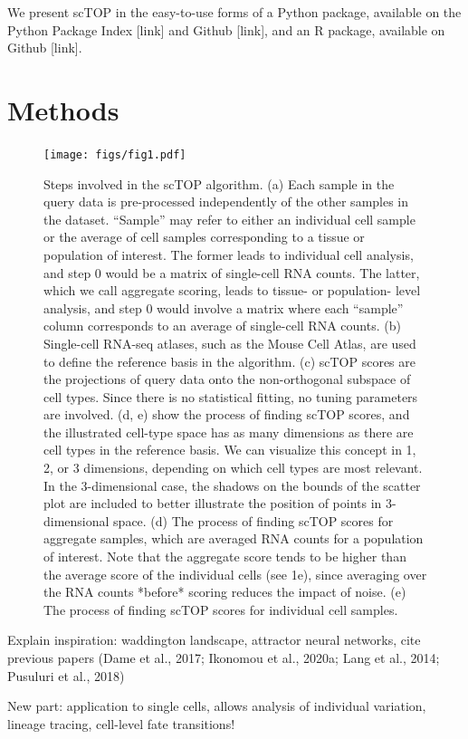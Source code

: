 \documentclass[aps,superscriptaddress, notitlepage,longbibliography]{revtex4-1}
\begin{document}
We present scTOP in the easy-to-use forms of a Python package, available on the Python Package Index [link] and Github [link], and an R package, available on Github [link].

\section{Methods}
\begin{figure}
	\centering
		\texttt{[image: figs/fig1.pdf]}
	\caption{Steps involved in the scTOP algorithm. (a) Each sample in the query data is pre-processed independently of the other samples in the dataset. “Sample” may refer to either an individual cell sample or the average of cell samples corresponding to a tissue or population of interest. The former leads to individual cell analysis, and step 0 would be a matrix of single-cell RNA counts. The latter, which we call aggregate scoring, leads to tissue- or population- level analysis, and step 0 would involve a matrix where each “sample” column corresponds to an average of single-cell RNA counts. (b) Single-cell RNA-seq atlases, such as the Mouse Cell Atlas, are used to define the reference basis in the algorithm. (c) scTOP scores are the projections of query data onto the non-orthogonal subspace of cell types. Since there is no statistical fitting, no tuning parameters are involved. (d, e) show the process of finding scTOP scores, and the illustrated cell-type space has as many dimensions as there are cell types in the reference basis. We can visualize this concept in 1, 2, or 3 dimensions, depending on which cell types are most relevant. In the 3-dimensional case, the shadows on the bounds of the scatter plot are included to better illustrate the position of points in 3-dimensional space. (d) The process of finding scTOP scores for aggregate samples, which are averaged RNA counts for a population of interest. Note that the aggregate score tends to be higher than the average score of the individual cells (see 1e), since averaging over the RNA counts *before* scoring reduces the impact of noise. (e) The process of finding scTOP scores for individual cell samples.}
	\label{FIG:1}
\end{figure}

Explain inspiration: waddington landscape, attractor neural networks, cite previous papers (Dame et al., 2017; Ikonomou et al., 2020a; Lang et al., 2014; Pusuluri et al., 2018)

New part: application to single cells, allows analysis of individual variation, lineage tracing, cell-level fate transitions!
\end{document}

